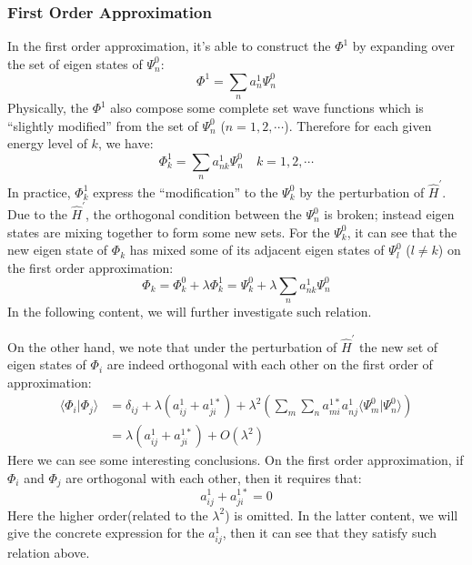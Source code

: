 \subsubsection{First Order Approximation}\label{1st_approximation_WT}
In the first order approximation, it's able to construct the
$\Phi^{1}$ by expanding over the set of eigen states of
$\Psi^{0}_{n}$:
\begin{equation}\label{}
\Phi^{1} = \sum_{n}a^{1}_{n}\Psi^{0}_{n}
\end{equation}
Physically, the $\Phi^{1}$ also compose some complete set wave
functions which is ``slightly modified'' from the set of
$\Psi^{0}_{n}$ ($n=1,2,\cdots$). Therefore for each given energy
level of $k$, we have:
\begin{equation}\label{PTIQMeq:8}
\Phi^{1}_{k} = \sum_{n}a^{1}_{nk}\Psi^{0}_{n} \quad k=1,2,\cdots
\end{equation}
In practice, $\Phi^{1}_{k}$ express the ``modification'' to the
$\Psi^{0}_{k}$ by the perturbation of $\hat{H}^{'}$. Due to the
$\hat{H}^{'}$, the orthogonal condition between the $\Psi^{0}_{n}$
is broken; instead eigen states are mixing together to form some new
sets. For the $\Psi^{0}_{k}$, it can see that the new eigen state of
$\Phi_{k}$ has mixed some of its adjacent eigen states of
$\Psi^{0}_{l}$ ($l \neq k$) on the first order approximation:
\begin{equation}\label{}
\Phi_{k} = \Phi_{k}^{0} + \lambda\Phi_{k}^{1} = \Psi^{0}_{k} +
\lambda\sum_{n}a^{1}_{nk}\Psi^{0}_{n}
\end{equation}
In the following content, we will further investigate such relation.

On the other hand, we note that under the perturbation of
$\hat{H}^{'}$ the new set of eigen states of $\Phi_{i}$ are indeed
orthogonal with each other on the first order of approximation:
\begin{align}\label{}
\langle\Phi_{i}|\Phi_{j}\rangle &= \delta_{ij} + \lambda(a^{1}_{ij}
+ a^{1*}_{ji}) + \lambda^{2}(\sum_{m}\sum_{n}a^{1*}_{mi}a^{1}_{nj}
\langle\Psi^{0}_{m}|\Psi^{0}_{n}\rangle) \nonumber \\
&=\lambda(a^{1}_{ij} + a^{1*}_{ji}) + O(\lambda^{2})
\end{align}
Here we can see some interesting conclusions. On the first order
approximation, if $\Phi_{i}$ and $\Phi_{j}$ are orthogonal with each
other, then it requires that:
\begin{equation}\label{}
a^{1}_{ij} + a^{1*}_{ji} = 0
\end{equation}
Here the higher order(related to the $\lambda^{2}$) is omitted. In
the latter content, we will give the concrete expression for the
$a^{1}_{ij}$, then it can see that they satisfy such relation above.

